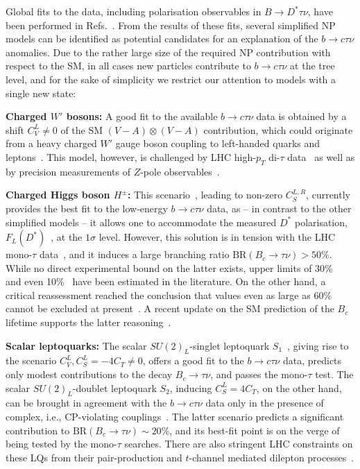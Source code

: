 \documentclass[10pt]{article}
\begin{document}
Global fits to the data, including polarisation observables in $B\to D^*\tau\nu$, have been performed in Refs.~\cite{Murgui:2019czp,Shi:2019gxi,Aebischer:2019mlg,Blanke:2019qrx}. From the results of these fits, several simplified NP models can be identified as potential candidates for an explanation of the $b\to c\tau\nu$ anomalies. Due to the rather large size of the required NP contribution with respect to the SM, in all cases new particles contribute to $b\to c\tau\nu$ at the tree level, and for the sake of simplicity we restrict our attention to models with a single new state:

{\bf\boldmath Charged $W'$ bosons:} A good fit to the available $b\to c\tau\nu$ data is obtained by a shift $C_V^L\ne 0$ of the SM $(V-A)\otimes (V-A)$ contribution, which could originate from a heavy charged $W'$ gauge boson coupling to left-handed quarks and leptons~\cite{He:2012zp,Greljo:2015mma}. This model, however, is challenged by LHC high-$p_T$ di-$\tau$ data~\cite{Faroughy:2016osc} as well as by precision measurements of $Z$-pole observables~\cite{Feruglio:2016gvd}. 

{\bf\boldmath Charged Higgs boson $H^\pm$:} 
This scenario~\cite{Kalinowski:1990ba,Hou:1992sy,Crivellin:2012ye,Crivellin:2015hha}, leading to non-zero $C_S^{L,R}$, currently provides the best fit to the low-energy $b\to c\tau\nu$ data, as -- in contrast to the other simplified models -- it allows one to accommodate the measured $D^*$ polarisation, $F_L(D^*)$~\cite{Abdesselam:2019wbt}, at the $1\sigma$ level. However, this solution is in tension with the LHC mono-$\tau$ data~\cite{Greljo:2018tzh}, and it induces a large branching ratio $\text{BR}(B_c\to\tau\nu)>50\%$. While no direct experimental bound on the latter exists, upper limits of 30\%~\cite{Alonso:2016oyd} and even 10\%~\cite{Akeroyd:2017mhr} have been estimated in the literature. On the other hand, a critical reassessment reached the conclusion that values even as large as 60\% cannot be excluded at present~\cite{Blanke:2018yud,Blanke:2019qrx}. A recent update on the SM prediction of the $B_c$ lifetime supports the latter reasoning~\cite{Aebischer:2021ilm}.

{\bf\boldmath Scalar leptoquarks:} The scalar $SU(2)_L$-singlet leptoquark $S_1$~\cite{Deshpande:2012rr,Tanaka:2012nw,Sakaki:2013bfa}, giving rise to the scenario $C_V^L, C_S^L=-4C_T\ne0$, offers a good fit to the $b\to c\tau\nu$ data, predicts only modest contributions to the decay $B_c\to\tau\nu$, and passes the mono-$\tau$ test. The scalar $SU(2)_L$-doublet leptoquark $S_2$, inducing $C_S^L=4C_T$, on the other hand, can be brought in agreement with the $b\to c\tau\nu$ data only in the presence of complex, i.e., CP-violating couplings~\cite{Becirevic:2018afm}. The latter scenario predicts a significant contribution to $\text{BR}(B_c\to\tau\nu)\sim 20\%$, and its best-fit point is on the verge of being tested by the mono-$\tau$ searches. There are also stringent LHC constraints on these LQs from their pair-production and $t$-channel mediated dilepton processes~\cite{Angelescu:2018tyl, Babu:2020hun}.   
\end{document}
